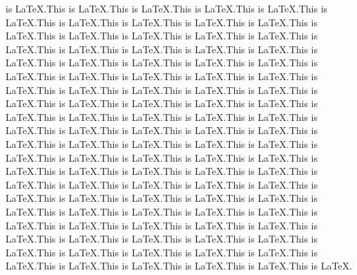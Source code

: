 \documentclass{article}
\begin{document}
is \LaTeX.This is \LaTeX.This is \LaTeX.This is \LaTeX.This is \LaTeX.This is \LaTeX.This is \LaTeX.This is \LaTeX.This is \LaTeX.This is \LaTeX.This is \LaTeX.This is \LaTeX.This is \LaTeX.This is \LaTeX.This is \LaTeX.This is \LaTeX.This is \LaTeX.This is \LaTeX.This is \LaTeX.This is \LaTeX.This is \LaTeX.This is \LaTeX.This is \LaTeX.This is \LaTeX.This is \LaTeX.This is \LaTeX.This is \LaTeX.This is \LaTeX.This is \LaTeX.This is \LaTeX.This is \LaTeX.This is \LaTeX.This is \LaTeX.This is \LaTeX.This is \LaTeX.This is \LaTeX.This is \LaTeX.This is \LaTeX.This is \LaTeX.This is \LaTeX.This is \LaTeX.This is \LaTeX.This is \LaTeX.This is \LaTeX.This is \LaTeX.This is \LaTeX.This is \LaTeX.This is \LaTeX.This is \LaTeX.This is \LaTeX.This is \LaTeX.This is \LaTeX.This is \LaTeX.This is \LaTeX.This is \LaTeX.This is \LaTeX.This is \LaTeX.This is \LaTeX.This is \LaTeX.This is \LaTeX.This is \LaTeX.This is \LaTeX.This is \LaTeX.This is \LaTeX.This is \LaTeX.This is \LaTeX.This is \LaTeX.This is \LaTeX.This is \LaTeX.This is \LaTeX.This is \LaTeX.This is \LaTeX.This is \LaTeX.This is \LaTeX.This is \LaTeX.This is \LaTeX.This is \LaTeX.This is \LaTeX.This is \LaTeX.This is \LaTeX.This is \LaTeX.This is \LaTeX.This is \LaTeX.This is \LaTeX.This is \LaTeX.This is \LaTeX.This is \LaTeX.This is \LaTeX.This is \LaTeX.This is \LaTeX.This is \LaTeX.This is \LaTeX.This is \LaTeX.This is \LaTeX.This is \LaTeX.This is \LaTeX.This is \LaTeX.This is \LaTeX.This is \LaTeX.This is \LaTeX.This is \LaTeX.
\end{document}
